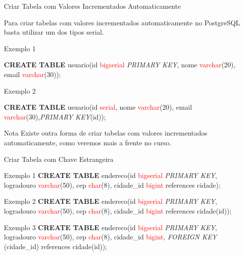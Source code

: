 \documentclass[xcolor=x11names,compress]{beamer}
\begin{document}
\begin{frame}[allowframebreaks]{Criar Tabela com Valores Incrementados Automaticamente}

Para criar tabelas com valores incrementados automaticamente no PostgreSQL basta utilizar um dos tipos serial.

\begin{alertblock}{Exemplo 1}

\textbf{CREATE TABLE} usuario(id \textcolor{red}{bigserial} \textit{PRIMARY KEY}, nome \textcolor{red}{varchar}(20), email \textcolor{red}{varchar}(30));

\end{alertblock}

\begin{alertblock}{Exemplo 2}

\textbf{CREATE TABLE} usuario(id \textcolor{red}{serial}, nome \textcolor{red}{varchar}(20), email \textcolor{red}{varchar}(30),\textit{PRIMARY KEY}(id));

\end{alertblock}

\begin{alertblock}{\centering Nota}
\centering Existe outra forma de criar tabelas com valores incrementados automaticamente, como veremos mais a frente no curso.
\end{alertblock}

\end{frame}


\begin{frame}[allowframebreaks]{Criar Tabela com Chave Estrangeira}

\begin{alertblock}{Exemplo 1}
\textbf{CREATE TABLE} endereco(id \textcolor{red}{bigserial} \textit{PRIMARY KEY}, logradouro \textcolor{red}{varchar}(50), cep \textcolor{red}{char}(8), cidade\_id \textcolor{red}{bigint} references cidade);
\end{alertblock}

\begin{alertblock}{Exemplo 2}
\textbf{CREATE TABLE} endereco(id \textcolor{red}{bigserial} \textit{PRIMARY KEY}, logradouro \textcolor{red}{varchar}(50), cep \textcolor{red}{char}(8), cidade\_id \textcolor{red}{bigint} references cidade(id));
\end{alertblock}

\begin{alertblock}{Exemplo 3}
\textbf{CREATE TABLE} endereco(id \textcolor{red}{bigserial} \textit{PRIMARY KEY}, logradouro \textcolor{red}{varchar}(50), cep \textcolor{red}{char}(8), cidade\_id \textcolor{red}{bigint}, \textit{FOREIGN KEY} (cidade\_id) references cidade(id));
\end{alertblock}

\end{frame}
\end{document}
